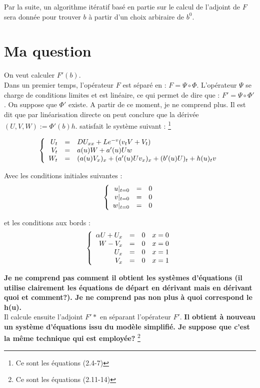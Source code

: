 \documentclass[a4paper,10pt]{article}
\begin{document}
Par la suite, un algorithme itératif basé en partie sur le calcul de l'adjoint de $F$ sera donnée pour trouver $b$ à partir d'un choix arbiraire de $b^0$.

\section{Ma question}
On veut calculer $F'(b)$.\\

Dans un premier temps, l'opérateur $F$ est séparé en : $F=\Psi \circ  \Phi$. L'opérateur $\Psi$ se charge de conditions limites et est linéaire, ce qui permet de dire que : $F'=\Psi \circ  \Phi '$. On suppose que $\Phi '$ existe.
A partir de ce moment, je ne comprend plus. Il est dit que par linéarisation directe on peut conclure que la dérivée $(U,V,W):=\Phi '(b)h$. satisfait le système suivant : \footnote{Ce sont les équations (2.4-7)}

\[
\left\{
\begin{array}{r c l}
U_t		&=&		D U_{xx} + L e^{-v} (v_t V +V_t)		\\
V_t		&=&		a(u)W + a'(u)Uw						\\
W_t		&=&		(a(u)V_x)_x + (a'(u)Uv_x)_x + (b'(u)U)_t + h(u)_t v\\
\end{array}
\right.
\]

Avec les conditions initiales suivantes :
\[
\left\{
\begin{array}{r c l}
u|_{t=0}		&=&		0		\\
v|_{t=0}		&=&		0		\\
w|_{t=0}		&=&		0		\\
\end{array}
\right.
\]

et les conditions aux bords :
\[
\left\{
\begin{array}{r c l c r}
\alpha U + U_x	&=&		0 	&	x = 0\\
W		- V_x 	&=&		0	&	x = 0\\
U_x	&=&		0 	&	x = 1\\
V_x 	&=&		0	&	x = 1\\
\end{array}
\right.
\]

\textbf{Je ne comprend pas comment il obtient les systèmes d'équations (il utilise clairement les équations de départ en dérivant mais en dérivant quoi et comment?). Je ne comprend pas non plus à quoi correspond le h(u).}\\

Il calcule ensuite l'adjoint $F'*$ en séparant l'opérateur $F'$. \textbf{Il obtient à nouveau un système d'équations issu du modèle simplifié. Je suppose que c'est la même technique qui est employée? } \footnote{Ce sont les équations (2.11-14)}


\clearpage
\end{document}
